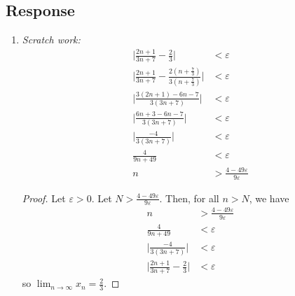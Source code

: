 \documentclass[13pt]{article}
\begin{document}
\subsection*{Response}
\begin{enumerate}[label=(\alph*)]
\item
  \textit{Scratch work:}
  \begin{align*}
    \bigg|\frac{2n + 1}{3n + 7} - \frac{2}{3}\bigg| &< \varepsilon \\
    \bigg|\frac{2n + 1}{3n + 7} - \frac{2(n + \frac{7}{3})}{3(n +
    \frac{7}{3})}\bigg| &< \varepsilon \\
    \bigg|\frac{3(2n + 1) - 6n - 7}{3(3n + 7)}\bigg| &< \varepsilon
    \\
    \bigg|\frac{6n + 3 - 6n - 7}{3(3n + 7)}\bigg| &< \varepsilon \\
    \bigg|\frac{-4}{3(3n + 7)}\bigg| &< \varepsilon \\
    \frac{4}{9n + 49} &< \varepsilon \\
    n &> \frac{4 - 49\varepsilon}{9\varepsilon}
  \end{align*}
  \begin{proof}
    Let $\varepsilon > 0$. Let $N > \frac{4 -
      49\varepsilon}{9\varepsilon}$. Then, for all $n > N$, we have
    \begin{align*}
      n &> \frac{4 - 49\varepsilon}{9\varepsilon} \\
      \frac{4}{9n + 49} &< \varepsilon \\
      \bigg|\frac{-4}{3(3n + 7)}\bigg| &< \varepsilon \\
      \bigg|\frac{2n + 1}{3n + 7} - \frac{2}{3}\bigg| &< \varepsilon
    \end{align*}
    so $\lim_{n \rightarrow \infty} x_n = \frac{2}{3}$.
  \end{proof}


\end{enumerate}
\end{document}
